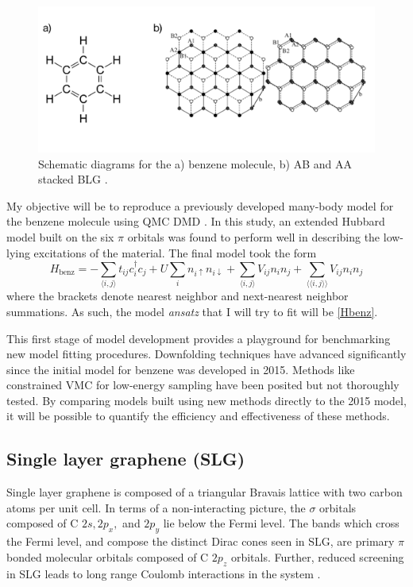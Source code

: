 \documentclass[12pt]{article}
\begin{document}
\begin{figure}
\centering
\includegraphics[width=1.0\linewidth]{./figs/proposed.pdf}
\caption{Schematic diagrams for the a) benzene molecule, b) AB and AA stacked BLG \cite{doi:10.1063/1.5007713}.}
\label{fig:proposed}
\end{figure}

My objective will be to reproduce a previously developed many-body model for the benzene molecule using QMC DMD \cite{Wagner2015}.
In this study, an extended Hubbard model built on the six $\pi$ orbitals was found to perform well in describing the low-lying excitations of the material.
The final model took the form 
\begin{equation}
H_\text{benz} = -\sum_{\langle i,j \rangle} t_{ij}c_i^\dagger c_j + U \sum_i n_{i\uparrow}n_{i\downarrow}  + \sum_{\langle i,j \rangle}V_{ij} n_i n_j + \sum_{\langle \langle i,j \rangle\rangle}V_{ij} n_i n_j
\label{Hbenz}
\end{equation}
where the brackets denote nearest neighbor and next-nearest neighbor summations.
As such, the model \textit{ansatz} that I will try to fit will be \eqref{Hbenz}.

This first stage of model development provides a playground for benchmarking new model fitting procedures.
Downfolding techniques have advanced significantly since the initial model for benzene was developed in 2015.
Methods like constrained VMC for low-energy sampling have been posited but not thoroughly tested.
By comparing models built using new methods directly to the 2015 model, it will be possible to quantify the efficiency and effectiveness of these methods.

\subsection{Single layer graphene (SLG)}
Single layer graphene is composed of a triangular Bravais lattice with two carbon atoms per unit cell.
In terms of a non-interacting picture, the $\sigma$ orbitals composed of C $2s, 2p_x,$ and $2p_y$ lie below the Fermi level.
The bands which cross the Fermi level, and compose the distinct Dirac cones seen in SLG, are primary $\pi$ bonded molecular orbitals composed of C $2p_z$ orbitals.
Further, reduced screening in SLG leads to long range Coulomb interactions in the system \cite{Elias2012, Yu2013}.
\end{document}
